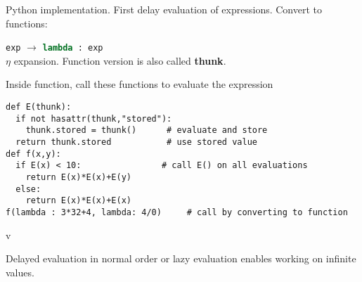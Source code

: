 Python implementation. First delay evaluation of expressions. Convert to functions:

\lstinline!exp! $\rightarrow$ \lstinline[language=Python]!lambda : exp! \\
$\eta$ expansion. Function version is also called \textbf{thunk}.

Inside function, call these functions to evaluate the expression
\begin{listing}[ht]

\begin{verbatim}
def E(thunk):
  if not hasattr(thunk,"stored"):
    thunk.stored = thunk()      # evaluate and store
  return thunk.stored           # use stored value
def f(x,y):
  if E(x) < 10:                # call E() on all evaluations
    return E(x)*E(x)+E(y)
  else:
    return E(x)*E(x)+E(x)
f(lambda : 3*32+4, lambda: 4/0)     # call by converting to function
\end{verbatim}

\caption{}
\label{code:code9}
\end{listing}v

Delayed evaluation in normal order or lazy evaluation enables working on infinite values.
